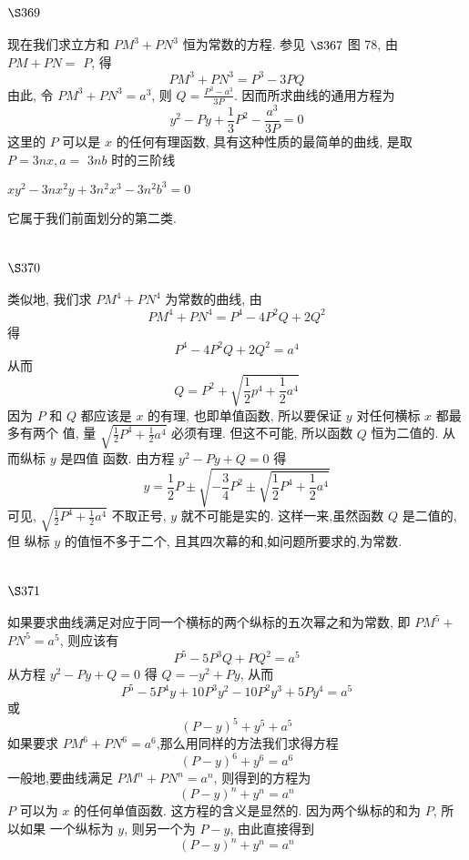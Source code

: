 \section{$\S 369$}

现在我们求立方和 $P M^{3}+P N^{3}$ 恒为常数的方程. 参见 $\S 367$ 图 78, 由 $P M+P N=$ $P$, 得
\[
P M^{3}+P N^{3}=P^{3}-3 P Q
\]
由此, 令 $P M^{3}+P N^{3}=a^{3}$, 则 $Q=\frac{P^{3}-a^{3}}{3 P}$. 因而所求曲线的通用方程为
\[
y^{2}-P y+\frac{1}{3} P^{2}-\frac{a^{3}}{3 P}=0
\]
这里的 $P$ 可以是 $x$ 的任何有理函数, 具有这种性质的最简单的曲线, 是取 $P=3 n x, a=$ $3 n b$ 时的三阶线 

$x y^{2}-3 n x^{2} y+3 n^{2} x^{3}-3 n^{2} b^{3}=0$

它属于我们前面划分的第二类.

\section{$\S 370$}

类似地, 我们求 $P M^{4}+P N^{4}$ 为常数的曲线, 由
\[
P M^{4}+P N^{4}=P^{4}-4 P^{2} Q+2 Q^{2}
\]
得
\[
P^{4}-4 P^{2} Q+2 Q^{2}=a^{4}
\]
从而
\[
Q=P^{2}+\sqrt{\frac{1}{2} p^{4}+\frac{1}{2} a^{4}}
\]
因为 $P$ 和 $Q$ 都应该是 $x$ 的有理, 也即单值函数, 所以要保证 $y$ 对任何横标 $x$ 都最多有两个 值, 量 $\sqrt{\frac{1}{2} P^{4}+\frac{1}{2} a^{4}}$ 必须有理. 但这不可能, 所以函数 $Q$ 恒为二值的. 从而纵标 $y$ 是四值 函数. 由方程 $y^{2}-P y+Q=0$ 得
\[
y=\frac{1}{2} P \pm \sqrt{-\frac{3}{4} P^{2} \pm \sqrt{\frac{1}{2} P^{4}+\frac{1}{2} a^{4}}}
\]
可见, $\sqrt{\frac{1}{2} P^{4}+\frac{1}{2} a^{4}}$ 不取正号, $y$ 就不可能是实的. 这样一来,虽然函数 $Q$ 是二值的,但 纵标 $y$ 的值恒不多于二个, 且其四次幕的和,如问题所要求的,为常数.

\section{$\S 371$}

如果要求曲线满足对应于同一个横标的两个纵标的五次幂之和为常数, 即 $P M^{5}+$ $P N^{5}=a^{5}$, 则应该有
\[
P^{5}-5 P^{3} Q+P Q^{2}=a^{5}
\]
从方程 $y^{2}-P y+Q=0$ 得 $Q=-y^{2}+P y$, 从而
\[
P^{5}-5 P^{4} y+10 P^{3} y^{2}-10 P^{2} y^{3}+5 P y^{4}=a^{5}
\]
或
\[
(P-y)^{5}+y^{5}+a^{5}
\]
如果要求 $P M^{6}+P N^{6}=a^{6}$,那么用同样的方法我们求得方程
\[
(P-y)^{6}+y^{6}=a^{6}
\]
一般地,要曲线满足 $P M^{n}+P N^{n}=a^{n}$, 则得到的方程为
\[
(P-y)^{n}+y^{n}=a^{n}
\]
$P$ 可以为 $x$ 的任何单值函数. 这方程的含义是显然的. 因为两个纵标的和为 $P$, 所以如果 一个纵标为 $y$, 则另一个为 $P-y$, 由此直接得到 
\[
(P-y)^{n}+y^{n}=a^{n}
\]
